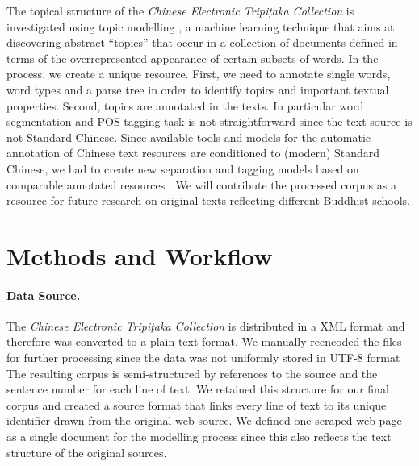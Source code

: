 \documentclass[a4paper,10pt]{article}
\begin{document}
The topical structure of the \textit{Chinese Electronic Tripi{\d{t}}aka
  Collection}  is investigated using topic
modelling \cite{blei2012probabilistic}, a machine learning technique that
aims at discovering abstract ``topics'' that occur in a collection of
documents defined in terms of the overrepresented appearance of certain
subsets of words. In the process, we create a unique resource. First, we
need to annotate single words, word types and a parse tree in order to
identify topics and important textual properties. Second, topics are
annotated in the texts.  In particular word segmentation and POS-tagging
task is not straightforward since the text source is not Standard
Chinese. Since available tools and models for the automatic annotation of
Chinese text resources are conditioned to (modern) Standard Chinese, we had
to create new separation and tagging models based on comparable annotated
resources .  We will contribute the processed
corpus as a resource for future research on original texts reflecting
different Buddhist schools.

\section{Methods and Workflow} 

\paragraph{Data Source.} The \textit{Chinese Electronic Tripi{\d{t}}aka
  Collection} is distributed in a XML format  and therefore was
converted to a plain text format. We manually reencoded the files for further processing since the data was
not uniformly stored in UTF-8 format The resulting corpus is
semi-structured by references to the source and the sentence number for
each line of text. We retained this structure for our final corpus and
created a source format that links every line of text to its unique
identifier drawn from the original web source. We defined one scraped web
page as a single document for the modelling process since this also
reflects the text structure of the original sources.
    
\end{document}
